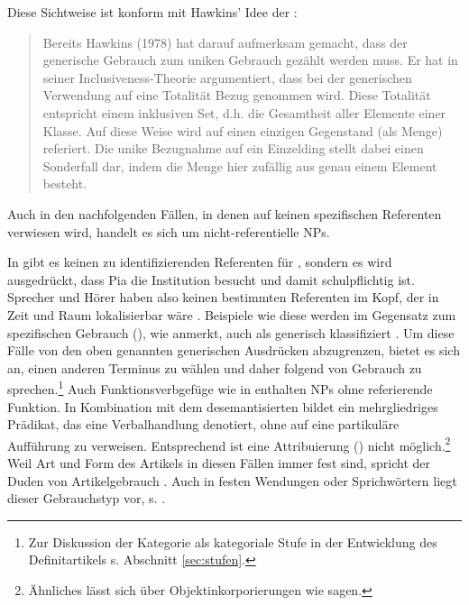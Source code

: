Diese Sichtweise ist konform mit Hawkins' Idee der :  \blockcquote[43]{Studler2011}{Bereits Hawkins (1978) hat darauf aufmerksam gemacht, dass der generische Gebrauch zum uniken Gebrauch gezählt werden muss. Er hat in seiner Inclusiveness-Theorie argumentiert, dass bei der generischen Verwendung auf eine Totalität Bezug genommen wird. Diese Totalität entspricht einem inklusiven Set, d.h. die Gesamtheit
aller Elemente einer Klasse. Auf diese Weise wird auf einen einzigen Gegenstand (als
Menge) referiert. Die unike Bezugnahme auf ein Einzelding stellt dabei einen Sonderfall
dar, indem die Menge hier zufällig aus genau einem Element besteht.} 



Auch in den nachfolgenden Fällen, in denen  auf keinen spezifischen Referenten verwiesen wird, handelt es sich um nicht-referentielle NPs. 

\begin{exe}
	\ex \label{ex:nonref}   
	\begin{xlist}
		\ex \label{ex:schule-pia}  
		\ex \label{ex:fvg} 
		\end{xlist}
\end{exe}
\noindent 
In  gibt es keinen zu identifizierenden Referenten für , sondern es wird ausgedrückt, dass Pia die Institution  besucht und damit schulpflichtig ist. Sprecher und Hörer haben also keinen bestimmten Referenten im Kopf, der in Zeit und Raum lokalisierbar wäre \parencite[40]{Bisle-Muller1991}. Beispiele wie diese werden im Gegensatz zum spezifischen Gebrauch (), wie \textcite[245]{Studler2011} anmerkt, auch als generisch klassifiziert \parencite[ähnlich][90]{Szczepaniak2011a}. Um diese Fälle von den oben genannten generischen Ausdrücken abzugrenzen, bietet es sich an, einen anderen Terminus zu wählen und daher \textcite[54]{Bisle-Muller1991} folgend von  Gebrauch zu sprechen.\footnote{Zur Diskussion der Kategorie  als kategoriale Stufe in der Entwicklung des Definitartikels s. Abschnitt \ref{sec:stufen}.} Auch Funktionsverbgefüge wie in  enthalten NPs ohne referierende Funktion. In Kombination mit dem desemantisierten  bildet  ein mehrgliedriges Prädikat, das eine Verbalhandlung denotiert, ohne auf eine partikuläre Aufführung zu verweisen. Entsprechend ist eine Attribuierung () nicht möglich.\footnote{Ähnliches lässt sich über Objektinkorporierungen wie  sagen.} Weil Art und Form des Artikels in diesen Fällen immer fest sind, spricht der Duden von  Artikelgebrauch \parencite[297-298]{Duden2009}. Auch in festen Wendungen oder Sprichwörtern liegt dieser Gebrauchstyp vor, s.   \parencite[298]{Duden2009}.  

